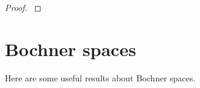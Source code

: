 \documentclass[english,a4paper,10pt,oneside]{scrbook}	%
\theoremstyle{break}
\newenvironment{mproof}[1][\proofname]{%
  \begin{proof}[#1]$ $\par\nobreak\ignorespaces
}{%
  \end{proof}
}
\renewcommand*{\proofname}{Proof}
\theoremstyle{remark}
\newcommand{\ds}{\displaystyle}
\newcommand{\cc}{\subset\subset}
\begin{document}
\begin{mproof}
%
%
%
%
%

\end{mproof}

\section{Bochner spaces}

Here are some useful results about Bochner spaces.
\end{document}
